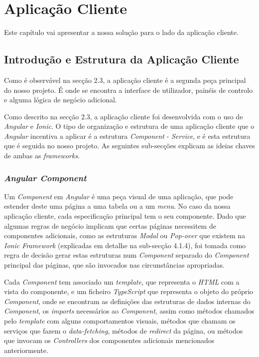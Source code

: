 %

\chapter{Aplicação Cliente} \label{cliente}

Este capítulo vai apresentar a nossa solução para o lado da aplicação cliente.

\section{Introdução e Estrutura da Aplicação Cliente} \label{sec41}
Como é observável na secção 2.3, a aplicação cliente é a segunda peça principal do nosso projeto. É onde se encontra a interface de utilizador, painéis de controlo e alguma lógica de negócio adicional.

Como descrito na secção 2.3, a aplicação cliente foi desenvolvida com o uso de \textit{Angular} e \textit{Ionic}. O tipo de organização e estrutura de uma aplicação cliente que o \emph{Angular} incentiva a aplicar é a estrutura \emph{Component} - \emph{Service}, e é esta estrutura que é seguida no nosso projeto.
As seguintes sub-secções explicam as ideias chaves de ambas as \textit{frameworks}.\\

\subsection{\textit{Angular Component}}\label{sub411}

Um \emph{Component} em \emph{Angular} é uma peça visual de uma aplicação, que pode estender deste uma página a uma tabela ou a um \textit{menu}. No caso da nossa aplicação cliente, cada especificação principal tem o seu componente. Dado que algumas regras de negócio implicam que certas páginas necessitem de componentes adicionais, como as estruturas \emph{Modal} ou \emph{Pop-over} que existem na \emph{Ionic Framework} (explicadas em detalhe na sub-secção 4.1.4), foi tomada como regra de decisão gerar estas estruturas num \emph{Component} separado do \emph{Component} principal das páginas, que são invocados nas circunstâncias apropriadas.

Cada \textit{Component} tem associado um \textit{template}, que representa o \textit{HTML} com a vista do componente, e um ficheiro \textit{TypeScript} que representa o objeto do próprio \textit{Component}, onde se encontram as definições das estruturas de dados internas do \textit{Component}, os \textit{imports} necessários ao \textit{Component}, assim como métodos chamados pelo \textit{template} com alguns comportamentos visuais, métodos que chamam os serviços que fazem o \textit{data-fetching}, métodos de \textit{redirect} da página, ou métodos que invocam os \textit{Controllers} dos componentes adicionais mencionados anteriormente.

